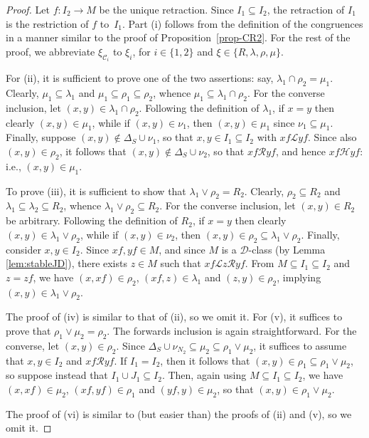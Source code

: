 \documentclass[11pt,a4paper]{article}
\newcommand{\C}{\mathscr C}
\renewcommand{\H}{\mathrel{\mathscr H}}
\renewcommand{\L}{\mathrel{\mathscr L}}
\newcommand{\R}{\mathrel{\mathscr R}}
\newcommand{\D}{\mathrel{\mathscr D}}
\newcommand{\lam}{\lambda}
\newcommand{\De}{\Delta}
\newcommand{\1}{\id_n}
\newcommand{\sub}{\subseteq}
\newcommand{\pf}{\begin{proof}}
\newcommand{\epf}{\end{proof}}
\numberwithin{equation}{section}
\theoremstyle{definition}
\begin{document}
\pf
Let $f:I_2\to M$ be the unique retraction.  Since $I_1\sub
  I_2$, the retraction of $I_1$ is the restriction of $f$ to~$I_1$.
  Part (i) follows from the definition of the congruences in a manner
  similar to the proof of Proposition~\ref{prop-CR2}.  For the rest of the proof, we abbreviate $\xi_{\C_i}$ to $\xi_i$, for $i\in\{1,2\}$ and $\xi\in\{R,\lam,\rho,\mu\}$.

For (ii), it is sufficient to prove one of the two assertions: say, $\lambda_1\cap \rho_2=\mu_1$.
Clearly, $\mu_1\subseteq \lambda_1$ and $\mu_1\subseteq \rho_1\subseteq \rho_2$, whence $\mu_1\subseteq \lambda_1\cap\rho_2$.
For the converse inclusion, let $(x,y)\in \lambda_1\cap\rho_2$.
Following the definition of $\lambda_1$, if $x=y$ then clearly $(x,y)\in \mu_1$, while if $(x,y)\in\nu_1$, then $(x,y)\in \mu_1$ since $\nu_1\subseteq\mu_1$.
Finally, suppose $(x,y)\not\in\De_S\cup\nu_1$, so that $x,y\in I_1\sub I_2$ with $xf\L yf$.
%
Since also $(x,y)\in\rho_2$, it follows that $(x,y)\not\in\De_S\cup\nu_2$, so that $xf\R yf$, and hence $xf\H yf$: i.e., $(x,y)\in\mu_1$.

To prove (iii), it is sufficient to show that $\lambda_1\vee\rho_2=R_2$.
Clearly, $\rho_2\subseteq R_2$ and $\lambda_1\subseteq \lambda_2\subseteq R_2$, whence $\lambda_1\vee\rho_2\subseteq R_2$.
For the converse inclusion, let $(x,y)\in R_2$ be arbitrary.
Following the definition of $R_2$, if $x=y$ then clearly $(x,y)\in \lambda_1\vee\rho_2$, while if $(x,y)\in \nu_2$, then
$(x,y)\in \rho_2\subseteq \lambda_1\vee\rho_2$.
Finally, consider $x,y\in I_2$.
Since $xf,yf\in M$, and since $M$ is a ${\D}$-class (by Lemma \ref{lem:stableJD}), there exists
$z\in M$ such that $xf\L z\R yf$.
From $M\subseteq I_1\subseteq I_2$ and $z=zf$, we have $(x,xf)\in\rho_2$,
$(xf,z)\in \lambda_1$ and $(z,y)\in \rho_2$, implying $(x,y)\in\lambda_1\vee\rho_2$. 

The proof of (iv) is similar to that of (ii), so we omit it.  For (v), it suffices to prove that $\rho_1\vee\mu_2=\rho_2$.  The forwards inclusion is again straightforward.  For the converse, let $(x,y)\in\rho_2$.  Since $\De_S\cup\nu_{N_2}\sub\mu_2\sub\rho_1\vee\mu_2$, it suffices to assume that $x,y\in I_2$ and $xf\R yf$.  If $I_1=I_2$, then it follows that $(x,y)\in\rho_1\sub\rho_1\vee\mu_2$, so suppose instead that $I_1\cup J_1\sub I_2$.  Then, again using $M\sub I_1\sub I_2$, we have $(x,xf)\in\mu_2$, $(xf,yf)\in\rho_1$ and $(yf,y)\in\mu_2$, so that $(x,y)\in\rho_1\vee\mu_2$.

The proof of (vi) is similar to (but easier than) the proofs of (ii) and (v), so we omit it.
\epf
\end{document}
